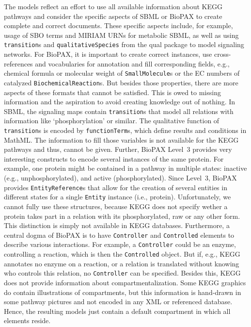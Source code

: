 \documentclass[10pt]{bmc_article}
\newenvironment{bmcformat}{\baselineskip20pt\sloppy\setboolean{publ}{false}}{\baselineskip20pt\sloppy}
\newcommand{\BiochemicalReactions}{\texttt{Bio\-chemical\-Reaction}s}
\newcommand{\Controller}{\texttt{Controller}}
\newcommand{\Controlled}{\texttt{Controlled}}
\newcommand{\EntityReferences}{\texttt{EntityReference}s}
\newcommand{\Entity}{\texttt{Entity}}
\newcommand{\functionTerms}{\texttt{functionTerm}s}
\newcommand{\qualitativeSpecies}{\texttt{qualitative\-Species}}
\newcommand{\SmallMolecules}{\texttt{Small\-Molecule}s}
\newcommand{\transitions}{\texttt{transition}s}
\begin{document}
\begin{bmcformat}
The models reflect an effort to use all available information about KEGG pathways and consider the specific aspects of SBML or BioPAX to create complete and correct documents. These specific aspects include, for example, usage of SBO terms and MIRIAM URNs for metabolic SBML, as well as using \transitions{} and \qualitativeSpecies{} from the qual package to model signaling networks. For BioPAX, it is important to create correct instances, use cross-references and vocabularies for annotation and fill corresponding fields, e.g., chemical formula or molecular weight of \SmallMolecules{} or the EC numbers of catalyzed \BiochemicalReactions.
%
But besides those properties, there are more aspects of these formats that cannot be satisfied. This is owed to missing information and the aspiration to avoid creating knowledge out of nothing.
%
In SBML, the signaling maps contain \transitions{} that model all relations with information like `phosphorylation' or similar. The qualitative function of \transitions{} is encoded by \functionTerms{}, which define results and conditions in MathML. The information to fill those variables is not available for the KEGG pathways and thus, cannot be given.
%
Further, BioPAX Level~3 provides very interesting constructs to encode several instances of the same protein. For example, one protein might be contained in a pathway in multiple states: inactive (e.g., unphosphorylated), and active (phosphorylated). Since Level~3, BioPAX provides \EntityReferences{} that allow for the creation of several entities in different states for a single \Entity{} instance (i.e., protein). Unfortunately, we cannot fully use these structures, because KEGG does not specify wether a protein takes part in a relation with its phosphorylated, raw or any other form. This distinction is simply not available in KEGG databases.
%
Furthermore, a central dogma of BioPAX is to have \Controller{} and \Controlled{} elements to describe various interactions. For example, a \Controller{} could be an enzyme, controlling a reaction, which is then the \Controlled{} object. But if, e.g., KEGG annotates no enzyme on a reaction, or a relation is translated without knowing who controls this relation, no \Controller{} can be specified.
%
%
%
Besides this, KEGG does not provide information about compartmentalization. Some KEGG graphics do contain illustrations of compartments, but this information is hand-drawn in some pathway pictures and not encoded in any XML or referenced database. Hence, the resulting models just contain a default compartment in which all elements reside.





\end{bmcformat}
\end{document}
